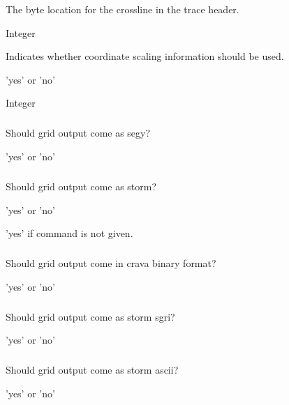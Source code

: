  \slist
   \item \Description The byte location for the crossline in the trace header.
   \item \Argument Integer
   \item \Default
 \elist

 \slist
   \item \Description Indicates whether coordinate scaling information should be used.
   \item \Argument 'yes' or 'no'
   \item \Default
 \elist

 \slist
   \item \Description 
   \item \Argument Integer
   \item \Default
 \elist

\subparagraph{}
 \slist
   \item \Description Should grid output come as segy?
   \item \Argument 'yes' or 'no'
   \item \Default
 \elist

\subparagraph{}
 \slist
   \item \Description Should grid output come as storm?
   \item \Argument 'yes' or 'no'
   \item \Default 'yes' if  command is not given.
 \elist


\subparagraph{}
 \slist
   \item \Description Should grid output come in crava binary format?
   \item \Argument 'yes' or 'no'
   \item \Default
 \elist

\subparagraph{}
 \slist
   \item \Description Should grid output come as storm sgri?
   \item \Argument 'yes' or 'no'
   \item \Default
 \elist

\subparagraph{}
 \slist
   \item \Description Should grid output come as storm ascii?
   \item \Argument 'yes' or 'no'
   \item \Default
 \elist

